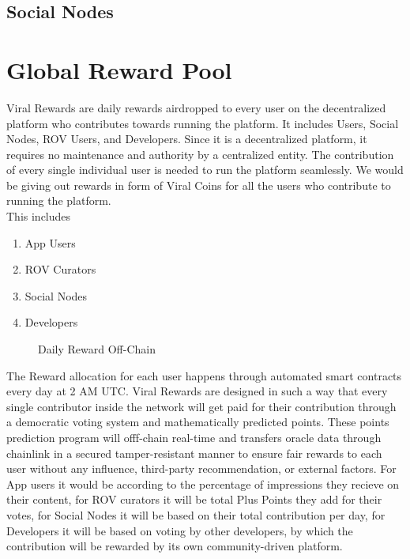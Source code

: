 \documentclass[10pt]{article}
\begin{document}
\subsection{Social Nodes}


\section{Global Reward Pool}

Viral Rewards are daily rewards airdropped to every user on the decentralized platform who contributes towards running the platform. It includes Users, Social Nodes, ROV Users, and Developers. Since it is a decentralized platform, it requires no maintenance and authority by a centralized entity. The contribution of every single individual user is needed to run the platform seamlessly. We would be giving out rewards in form of Viral Coins for all the users who contribute to running the platform.\\

This includes
\begin{enumerate}[leftmargin=+0.2in]
\item App Users
\item ROV Curators
\item Social Nodes
\item Developers
\end{enumerate}

\begin{figure}[H]
\begin{center}
\caption{Daily Reward Off-Chain}
\end{center}
\end{figure}


The Reward allocation for each user happens through automated smart contracts every day at 2 AM UTC. Viral Rewards are designed in such a way that every single contributor inside the network will get paid for their contribution through a democratic voting system and mathematically predicted points. These points prediction program will offf-chain real-time and transfers oracle data through chainlink in a secured tamper-resistant manner to ensure fair rewards to each user without any influence, third-party recommendation, or external factors. For App users it would be according to the percentage of impressions they recieve on their content, for ROV curators it will be total Plus Points they add for their votes, for Social Nodes it will be based on their total contribution per day, for Developers it will be based on voting by other developers, by which the contribution will be rewarded by its own community-driven platform.\\
\end{document}
